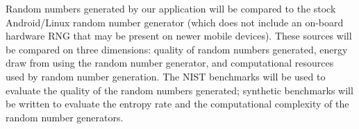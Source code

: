 Random numbers generated by our application will be compared to the stock
Android/Linux random number generator (which does not include an on-board
hardware RNG that may be present on newer mobile devices).  These sources will
be compared on three dimensions: quality of random numbers generated, energy
draw from using the random number generator, and computational resources used by
random number generation.  The NIST \cite{nist} benchmarks will be used to
evaluate the quality of the random numbers generated; synthetic benchmarks will
be written to evaluate the entropy rate and the computational complexity of the
random number generators.
